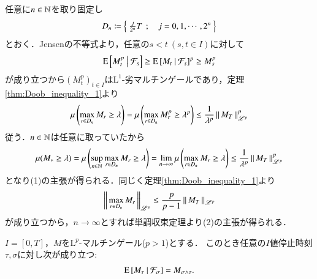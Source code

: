 	\begin{prf}
		任意に$n \in \mathbb{N}$を取り固定し
		\begin{align}
			D_n \coloneqq \left\{\ \tfrac{j}{2^n}T\ \, ; \quad j=0,1,\cdots,2^n\ \right\}
		\end{align}
		とおく．Jensenの不等式より，任意の$s < t\ (s,t \in I)$に対して
		\begin{align}
			\operatorname{E} \left[ M_t^p \ \middle|\ \mathcal{F}_s \right] \geq \operatorname{E} \left[ M_t \ \middle|\ \mathcal{F}_s \right]^p \geq M_s^p
		\end{align}
		が成り立つから$(M_t^p)_{t \in I}$は$\mathrm{L}^1$-劣マルチンゲールであり，定理\ref{thm:Doob_inequality_1}より
		\begin{align}
			\mu\left(\operatorname*{max}_{r \in D_n} M_r \geq \lambda\right)
			= \mu\left(\operatorname*{max}_{r \in D_n} M_r^p \geq \lambda^p\right) 
			\leq \frac{1}{\lambda^p} \left\|\, M_T\, \right\|_{\mathscr{L}^p}^p
		\end{align}
		従う．$n \in \mathbb{N}$は任意に取っていたから
		\begin{align}
			\mu(M_* \geq \lambda) 
			= \mu\left(\operatorname*{sup}_{n \in \mathbb{N}} \operatorname*{max}_{r \in D_n} M_r \geq \lambda\right)
			= \lim_{n \to \infty} \mu\left(\operatorname*{max}_{r \in D_n} M_r \geq \lambda\right) 
			\leq \frac{1}{\lambda^p} \left\|\, M_T\, \right\|_{\mathscr{L}^p}^p
		\end{align}
		となり(1)の主張が得られる．同じく定理\ref{thm:Doob_inequality_1}より
		\begin{align}
			\left\|\, \operatorname*{max}_{r \in D_n} M_r\, \right\|_{\mathscr{L}^p} \leq \frac{p}{p-1} \left\|\, M_T\, \right\|_{\mathscr{L}^p}
		\end{align}
		が成り立つから，$n \longrightarrow \infty$とすれば単調収束定理より(2)の主張が得られる．
		\QED
	\end{prf}
	
	\begin{screen}
		\begin{thm}[任意抽出定理(2)]
			$I = [0,T]$，$M$を$\mathrm{L}^p$-マルチンゲール($p > 1$)とする．
			このとき任意の$I$値停止時刻$\tau,\sigma$に対し次が成り立つ:
			\begin{align}
				\operatorname{E} \left[ M_\tau \ \middle|\ \mathcal{F}_\sigma \right] = M_{\sigma \wedge \tau}.
				\label{eq:thm_optional_sampling_theorem_2}
			\end{align}
			\label{thm:optional_sampling_theorem_2}
		\end{thm}
	\end{screen}
	
